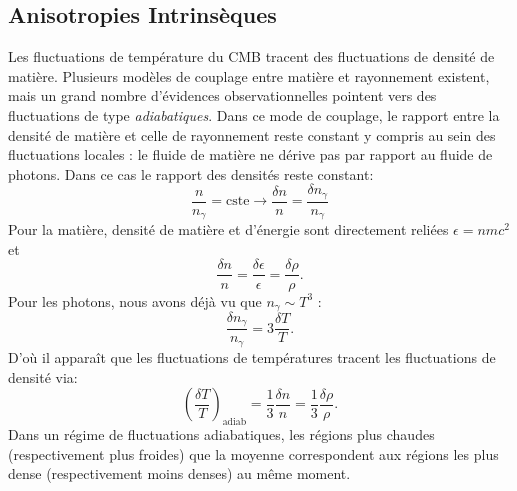 \subsection{Anisotropies Intrinsèques}
Les fluctuations de température du CMB tracent des fluctuations de densité de matière. Plusieurs modèles de couplage entre matière et rayonnement existent, mais un grand nombre d'évidences observationnelles pointent vers des fluctuations de type \textit{adiabatiques}. Dans ce mode de couplage, le rapport entre la densité de matière et celle de rayonnement reste constant y compris au sein des fluctuations locales : le fluide de matière ne dérive pas par rapport au fluide de photons. Dans ce cas le rapport des densités reste constant:
\begin{equation}
\frac{n}{n_\gamma}=\mathrm{cste}\rightarrow\frac{\delta n}{n}=\frac{\delta n_\gamma}{n_\gamma}
\end{equation}
Pour la matière, densité de matière et d'énergie sont directement reliées $\epsilon=n m c^2$  et
\begin{equation}
\frac{\delta n}{n}=\frac{\delta \epsilon}{\epsilon}=\frac{\delta \rho}{\rho}.
\end{equation}
Pour les photons, nous avons déjà vu que $n_\gamma \sim T^3$ :
\begin{equation}
\frac{\delta n_\gamma}{n_\gamma}=3 \frac{\delta T}{T}.
\end{equation}
D'où il apparaît que les fluctuations de températures tracent les fluctuations de densité via:
\begin{equation}
\left(\frac{\delta T}{T}\right)_\mathrm{adiab}=\frac{1}{3}\frac{\delta n}{n}=\frac{1}{3}\frac{\delta \rho}{\rho}.
\end{equation}
Dans un régime de fluctuations adiabatiques, les régions plus chaudes (respectivement plus froides) que la moyenne correspondent aux régions les plus dense (respectivement moins denses) au même moment. 

